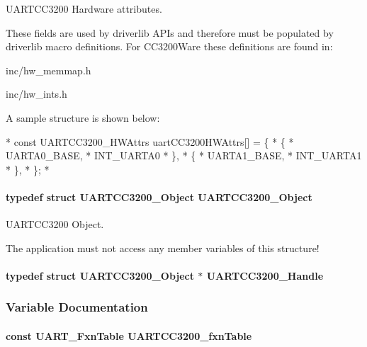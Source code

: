 U\-A\-R\-T\-C\-C3200 Hardware attributes. 

These fields are used by driverlib A\-P\-Is and therefore must be populated by driverlib macro definitions. For C\-C3200\-Ware these definitions are found in\-:
\begin{DoxyItemize}
\item inc/hw\-\_\-memmap.\-h
\item inc/hw\-\_\-ints.\-h
\end{DoxyItemize}

A sample structure is shown below\-: 
\begin{DoxyCode}
*  \textcolor{keyword}{const} UARTCC3200_HWAttrs uartCC3200HWAttrs[] = \{
*      \{
*          UARTA0\_BASE,
*          INT\_UARTA0
*      \},
*      \{
*          UARTA1\_BASE,
*          INT\_UARTA1
*      \},
*  \};
*  
\end{DoxyCode}
\paragraph[{U\-A\-R\-T\-C\-C3200\-\_\-\-Object}]{\setlength{\rightskip}{0pt plus 5cm}typedef struct {\bf U\-A\-R\-T\-C\-C3200\-\_\-\-Object}  {\bf U\-A\-R\-T\-C\-C3200\-\_\-\-Object}}\label{_u_a_r_t_c_c3200_8h_ab955379efacdd1121191c43ef60c6389}


U\-A\-R\-T\-C\-C3200 Object. 

The application must not access any member variables of this structure! 
\paragraph[{U\-A\-R\-T\-C\-C3200\-\_\-\-Handle}]{\setlength{\rightskip}{0pt plus 5cm}typedef struct {\bf U\-A\-R\-T\-C\-C3200\-\_\-\-Object} $\ast$ {\bf U\-A\-R\-T\-C\-C3200\-\_\-\-Handle}}\label{_u_a_r_t_c_c3200_8h_a7918e9066f5ecdeaba9075bf4fe71157}


\subsubsection{Variable Documentation}
\paragraph[{U\-A\-R\-T\-C\-C3200\-\_\-fxn\-Table}]{\setlength{\rightskip}{0pt plus 5cm}const {\bf U\-A\-R\-T\-\_\-\-Fxn\-Table} U\-A\-R\-T\-C\-C3200\-\_\-fxn\-Table}\label{_u_a_r_t_c_c3200_8h_af5c9fcf73d2540d179ec24ef172f1299}
